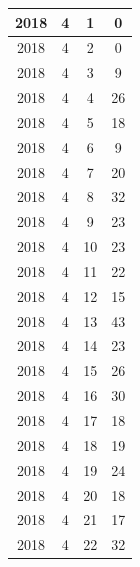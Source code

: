 \begin{longtable} {|c|c|c|c|}
\hline
2018         & 4            & 1            & 0                         \\ 
\hline
2018         & 4            & 2            & 0                         \\ 
\hline
2018         & 4            & 3            & 9                         \\ 
\hline
2018         & 4            & 4            & 26                        \\ 
\hline
2018         & 4            & 5            & 18                        \\ 
\hline
2018         & 4            & 6            & 9                         \\ 
\hline
2018         & 4            & 7            & 20                        \\ 
\hline
2018         & 4            & 8            & 32                        \\ 
\hline
2018         & 4            & 9            & 23                        \\ 
\hline
2018         & 4            & 10           & 23                        \\ 
\hline
2018         & 4            & 11           & 22                        \\ 
\hline
2018         & 4            & 12           & 15                        \\ 
\hline
2018         & 4            & 13           & 43                        \\ 
\hline
2018         & 4            & 14           & 23                        \\ 
\hline
2018         & 4            & 15           & 26                        \\ 
\hline
2018         & 4            & 16           & 30                        \\ 
\hline
2018         & 4            & 17           & 18                        \\ 
\hline
2018         & 4            & 18           & 19                        \\ 
\hline
2018         & 4            & 19           & 24                        \\ 
\hline
2018         & 4            & 20           & 18                        \\ 
\hline
2018         & 4            & 21           & 17                        \\ 
\hline
2018         & 4            & 22           & 32                        \\ 

\end{longtable}
